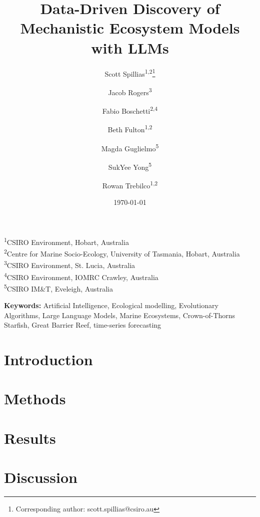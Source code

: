 \documentclass[12pt,a4paper]{article}
\title{Data-Driven Discovery of Mechanistic Ecosystem Models with LLMs}
\author{Scott Spillias\orcidlink{0000-0002-1310-5202}\textsuperscript{1,2}\thanks{Corresponding author: scott.spillias@csiro.au} \and
Jacob Rogers\orcidlink{0000-0002-4724-2555}\textsuperscript{3} \and
Fabio Boschetti\orcidlink{0000-0001-8999-6913}\textsuperscript{2,4} \and
Beth Fulton\orcidlink{0000-0002-5904-7917}\textsuperscript{1,2} \and
Magda Guglielmo\orcidlink{0000-0002-2800-0657}\textsuperscript{5} \and
SukYee Yong\orcidlink{0000-0002-5204-2902}\textsuperscript{5} \and
Rowan Trebilco\orcidlink{0000-0001-9712-8016}\textsuperscript{1,2}
}
\date{\today}
\newcommand{\keywords}{%
Artificial Intelligence,
Ecological modelling,
Evolutionary Algorithms,
Large Language Models,
Marine Ecosystems,
Crown-of-Thorns Starfish,
Great Barrier Reef,
time-series forecasting%
}
\newcommand{\affiliations}{
\noindent\textsuperscript{1}CSIRO Environment, Hobart, Australia\\
\textsuperscript{2}Centre for Marine Socio-Ecology, University of Tasmania, Hobart, Australia\\
\textsuperscript{3}CSIRO Environment, St. Lucia, Australia\\
\textsuperscript{4}CSIRO Environment, IOMRC Crawley, Australia\\
\textsuperscript{5}CSIRO IM\&T, Eveleigh, Australia\\
}
\begin{document}
\maketitle
\affiliations
\vspace{1em}

\noindent\textbf{Keywords:} \keywords
\vspace{2em}
\newpage


\section{Introduction}

\section{Methods}

\section{Results}

\section{Discussion}







\clearpage
\appendix

\end{document}
